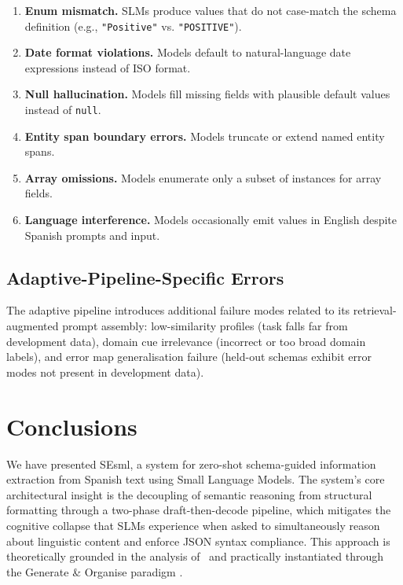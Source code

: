 \documentclass[onecolumn]{ceurart}
\begin{document}
\begin{enumerate}
  \item \textbf{Enum mismatch.} SLMs produce values that do not case-match the
  schema definition (e.g., \texttt{"Positive"} vs. \texttt{"POSITIVE"}).
  \item \textbf{Date format violations.} Models default to natural-language
  date expressions instead of ISO format.
  \item \textbf{Null hallucination.} Models fill missing fields with plausible
  default values instead of \texttt{null}.
  \item \textbf{Entity span boundary errors.} Models truncate or extend named
  entity spans.
  \item \textbf{Array omissions.} Models enumerate only a subset of instances
  for array fields.
  \item \textbf{Language interference.} Models occasionally emit values in
  English despite Spanish prompts and input.
\end{enumerate}

\subsection{Adaptive-Pipeline-Specific Errors}

The adaptive pipeline introduces additional failure modes related to its
retrieval-augmented prompt assembly: low-similarity profiles (task falls far
from development data), domain cue irrelevance (incorrect or too broad domain
labels), and error map generalisation failure (held-out schemas exhibit error
modes not present in development data).


\section{Conclusions}
\label{sec:conclusions}

We have presented SEsml, a system for zero-shot schema-guided information
extraction from Spanish text using Small Language Models. The system's core
architectural insight is the decoupling of semantic reasoning from structural
formatting through a two-phase draft-then-decode pipeline, which mitigates the
cognitive collapse that SLMs experience when asked to simultaneously reason
about linguistic content and enforce JSON syntax compliance. This approach is
theoretically grounded in the analysis of~\citet{reddy2026dccd} and
practically instantiated through the Generate \& Organise paradigm
\citep{li2024generate}.
\end{document}
